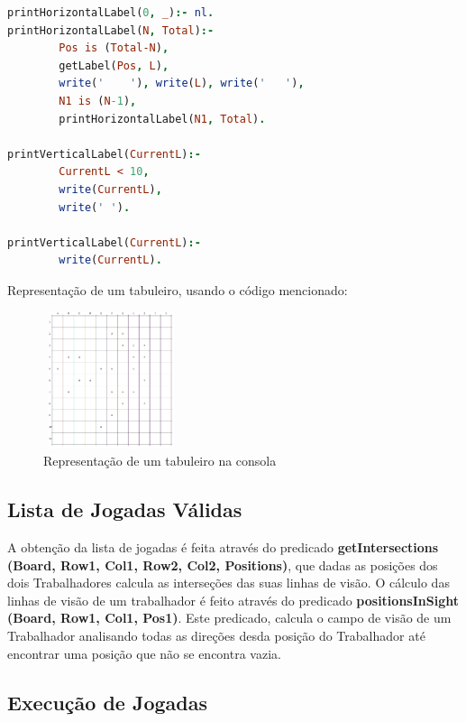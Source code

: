 \documentclass[a4paper]{article}
\begin{document}
\begin{lstlisting}[language=prolog]
printHorizontalLabel(0, _):- nl.
printHorizontalLabel(N, Total):-
        Pos is (Total-N),
        getLabel(Pos, L),
        write('    '), write(L), write('   '),
        N1 is (N-1),
        printHorizontalLabel(N1, Total).        

printVerticalLabel(CurrentL):-
        CurrentL < 10,
        write(CurrentL),
        write(' ').

printVerticalLabel(CurrentL):-
        write(CurrentL).

\end{lstlisting}

\newpagegit 

Representação de um tabuleiro, usando o código mencionado:\newline

\begin{figure}[h!]
\begin{center}
	\includegraphics[height=4cm, width=4cm]{images/self_semi_board.png}
	\caption{Representação de um tabuleiro na consola}
	\label{Figura 9}
\end{center}
\end{figure}

\newpage

\subsection{Lista de Jogadas Válidas}

A obtenção da lista de jogadas é feita através do predicado \textbf{getIntersections (Board, Row1, Col1, Row2, Col2, Positions)}, que dadas as posições dos dois Trabalhadores calcula as interseções das suas linhas de visão. O cálculo das linhas de visão de um trabalhador é feito através do predicado \textbf{positionsInSight (Board, Row1, Col1, Pos1)}. Este predicado, calcula o campo de visão de um Trabalhador analisando todas as direções desda posição do Trabalhador até encontrar uma posição que não se encontra vazia.

\newpage

\subsection{Execução de Jogadas}
\end{document}
